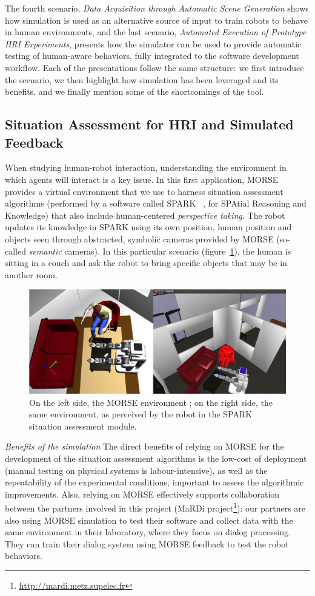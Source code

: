 \documentclass{llncs}
\begin{document}
The fourth scenario, \emph{Data Acquisition through Automatic Scene Generation}
shows how simulation is used as an alternative source of input to train robots to
behave in human environments, and the last scenario, \emph{Automated Execution
of Prototype HRI Experiments}, presents how the simulator can be used to provide
automatic testing of human-aware behaviors, fully integrated to the software
development workflow. Each of the presentations follow the same structure: we
first introduce the scenario, we then highlight how simulation has been leveraged
and its benefits, and we finally mention some of the shortcomings of the tool.

\subsection{Situation Assessment for HRI and Simulated Feedback}
\label{sc:assessment}

When studying human-robot interaction, understanding the environment in which
agents will interact is a key issue. In this first application, MORSE provides a
virtual environment that we use to harness situation assessment algorithms
(performed by a software called SPARK ~\cite{Warnier2012a}, for SPAtial
Reasoning and Knowledge) that also include human-centered \emph{perspective
taking}. The robot updates its knowledge in SPARK using its own position, human
position and objects seen through abstracted, symbolic cameras provided by MORSE
(so-called \emph{semantic} cameras). In this particular scenario
(figure~\ref{fig|spark}), the human is sitting in a couch and ask the robot to
bring specific objects that may be in another room.

\begin{figure}[t]
      \centering
      \includegraphics[width=0.7\linewidth]{morsespark.png}
      \caption{On the left side, the MORSE environment ; on the right side, the same
      environment, as perceived by the robot in the SPARK situation assessment
      module.}
      \label{fig|spark}
\end{figure}

\emph{Benefits of the simulation} The direct benefits of relying on MORSE for
the development of the situation assessment algorithms is the low-cost of
deployment (manual testing on physical systems is labour-intensive), as well as
the repeatability of the experimental conditions, important to assess the
algorithmic improvements.  Also, relying on MORSE effectively supports
collaboration between the partners involved in this project (MaRDi
project\footnote{\url{http://mardi.metz.supelec.fr}}): our partners are also
using MORSE simulation to test their software and collect data with the same
environment in their laboratory, where they focus on dialog processing. They can
train their dialog system using MORSE feedback to test the robot behaviors.
\end{document}
